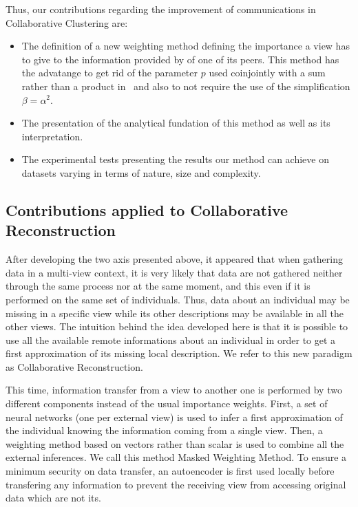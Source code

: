 Thus, our contributions regarding the improvement of communications in Collaborative Clustering are:
\begin{itemize}
    \item The definition of a new weighting method defining the importance a view has to give to the information provided by of one of its peers. This method has the advatange to get rid of the parameter $p$ used coinjointly with a sum rather than a product in~\cite{sublime2017analysis} and also to not require the use of the simplification $\beta = \alpha^2$.
    \item The presentation of the analytical fundation of this method as well as its interpretation.
    \item The experimental tests presenting the results our method can achieve on datasets varying in terms of nature, size and complexity.
\end{itemize}

\subsection{Contributions applied to Collaborative Reconstruction}

After developing the two axis presented above, it appeared that when gathering data in a multi-view context, it is very likely that data are not gathered neither through the same process nor at the same moment, and this even if it is performed on the same set of individuals. Thus, data about an individual may be missing in a specific view while its other descriptions may be available in all the other views. The intuition behind the idea developed here is that it is possible to use all the available remote informations about an individual in order to get a first approximation of its missing local description. We refer to this new paradigm as Collaborative Reconstruction.

This time, information transfer from a view to another one is performed by two different components instead of the usual importance weights. First, a set of neural networks (one per external view) is used to infer a first approximation of the individual knowing the information coming from a single view. Then, a weighting method based on vectors rather than scalar is used to combine all the external inferences. We call this method Masked Weighting Method. To ensure a minimum security on data transfer, an autoencoder is first used locally before transfering any information to prevent the receiving view from accessing original data which are not its.

